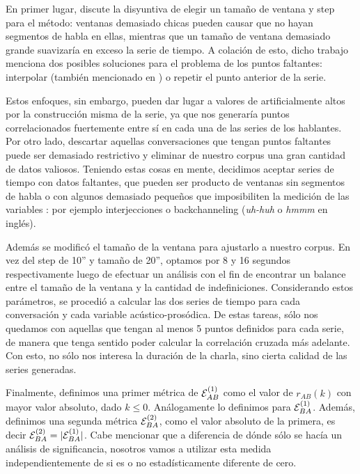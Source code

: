 En primer lugar, \cite{KOU2008.2} discute la disyuntiva de elegir un tamaño de ventana y step para el método: ventanas demasiado chicas pueden causar que no hayan segmentos de habla en ellas, mientras que un tamaño de ventana demasiado grande suavizaría en exceso la serie de tiempo. A colación de esto, dicho trabajo menciona dos posibles soluciones para el problema de los puntos faltantes: interpolar (también mencionado en \cite{DEL2013}) o repetir el punto anterior de la serie.

Estos enfoques, sin embargo, pueden dar lugar a valores de \entrainment artificialmente altos por la construcción misma de la serie, ya que nos generaría puntos correlacionados fuertemente entre sí en cada una de las series de los hablantes. Por otro lado, descartar aquellas conversaciones que tengan puntos faltantes puede ser demasiado restrictivo y eliminar de nuestro corpus una gran cantidad de datos valiosos. Teniendo estas cosas en mente, decidimos aceptar series de tiempo con datos faltantes, que pueden ser producto de ventanas sin segmentos de habla o con algunos demasiado pequeños que imposibiliten la medición de las variables \ap: por ejemplo interjecciones o backchanneling (\emph{uh-huh} o \emph{hmmm} en inglés).

Además se modificó el tamaño de la ventana para ajustarlo a nuestro corpus. En vez del step de 10'' y tamaño de 20'', optamos por 8 y 16 segundos respectivamente luego de efectuar un análisis con el fin de encontrar un balance entre el tamaño de la ventana y la cantidad de indefiniciones. Considerando estos parámetros, se procedió a calcular las dos series de tiempo para cada conversación y cada variable acústico-prosódica. De estas tareas, sólo nos quedamos con aquellas que tengan al menos 5 puntos definidos para cada serie, de manera que tenga sentido poder calcular la correlación cruzada más adelante. Con esto, no sólo nos interesa la duración de la charla, sino cierta calidad de las series generadas.

Finalmente, definimos una primer métrica de \entrainment $\mathcal{E}_{AB}^{(1)}$ como el valor de $r_{AB}(k)$ con mayor valor absoluto, dado $k \leq 0$. Análogamente lo definimos para $\mathcal{E}_{BA}^{(1)}$. Además, definimos una segunda métrica $\mathcal{E}_{BA}^{(2)}$, como el valor absoluto de la primera, es decir $\mathcal{E}_{BA}^{(2)} = |\mathcal{E}_{BA}^{(1)}|$. Cabe mencionar que a diferencia de \cite{KOU2008.2} dónde sólo se hacía un análisis de significancia, nosotros vamos a utilizar esta medida independientemente de si es o no estadísticamente diferente de cero.

